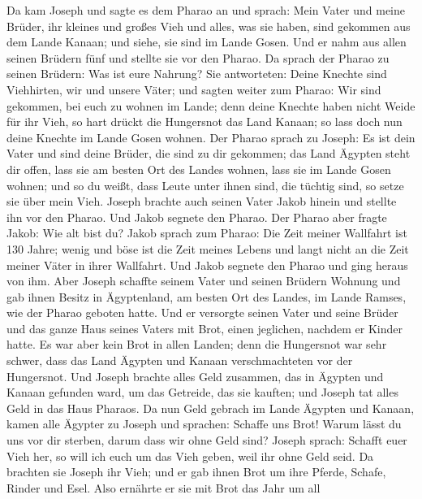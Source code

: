  Da kam Joseph und sagte es dem Pharao an und sprach: Mein
Vater und meine Brüder, ihr kleines und großes Vieh und alles, was sie
haben, sind gekommen aus dem Lande Kanaan; und siehe, sie sind im Lande
Gosen.  Und er nahm aus allen seinen Brüdern fünf und
stellte sie vor den Pharao.  Da sprach der Pharao zu
seinen Brüdern: Was ist eure Nahrung? Sie antworteten: Deine Knechte
sind Viehhirten, wir und unsere Väter;  und sagten weiter
zum Pharao: Wir sind gekommen, bei euch zu wohnen im Lande; denn deine
Knechte haben nicht Weide für ihr Vieh, so hart drückt die Hungersnot
das Land Kanaan; so lass doch nun deine Knechte im Lande Gosen wohnen.
 Der Pharao sprach zu Joseph: Es ist dein Vater und sind
deine Brüder, die sind zu dir gekommen;  das Land Ägypten
steht dir offen, lass sie am besten Ort des Landes wohnen, lass sie im
Lande Gosen wohnen; und so du weißt, dass Leute unter ihnen sind, die
tüchtig sind, so setze sie über mein Vieh.  Joseph brachte
auch seinen Vater Jakob hinein und stellte ihn vor den Pharao. Und Jakob
segnete den Pharao.  Der Pharao aber fragte Jakob: Wie alt
bist du?  Jakob sprach zum Pharao: Die Zeit meiner
Wallfahrt ist 130 Jahre; wenig und böse ist die Zeit meines Lebens und
langt nicht an die Zeit meiner Väter in ihrer Wallfahrt. 
Und Jakob segnete den Pharao und ging heraus von ihm. 
Aber Joseph schaffte seinem Vater und seinen Brüdern Wohnung und gab
ihnen Besitz in Ägyptenland, am besten Ort des Landes, im Lande Ramses,
wie der Pharao geboten hatte.  Und er versorgte seinen
Vater und seine Brüder und das ganze Haus seines Vaters mit Brot, einen
jeglichen, nachdem er Kinder hatte.  Es war aber kein
Brot in allen Landen; denn die Hungersnot war sehr schwer, dass das Land
Ägypten und Kanaan verschmachteten vor der Hungersnot. 
Und Joseph brachte alles Geld zusammen, das in Ägypten und Kanaan
gefunden ward, um das Getreide, das sie kauften; und Joseph tat alles
Geld in das Haus Pharaos.  Da nun Geld gebrach im Lande
Ägypten und Kanaan, kamen alle Ägypter zu Joseph und sprachen: Schaffe
uns Brot! Warum lässt du uns vor dir sterben, darum dass wir ohne Geld
sind?  Joseph sprach: Schafft euer Vieh her, so will ich
euch um das Vieh geben, weil ihr ohne Geld seid.  Da
brachten sie Joseph ihr Vieh; und er gab ihnen Brot um ihre Pferde,
Schafe, Rinder und Esel. Also ernährte er sie mit Brot das Jahr um all
